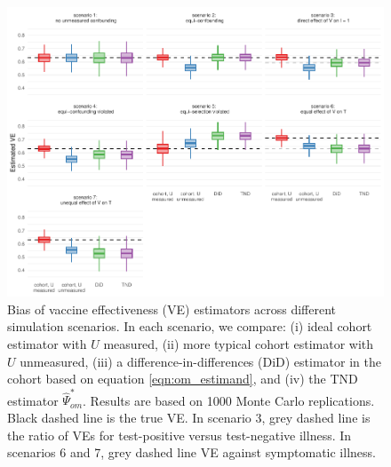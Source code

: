 \documentclass[11pt]{article}
\begin{document}
\begin{figure}
    \centering
    \includegraphics{../results/sims1.pdf}
    \caption{
        Bias of vaccine effectiveness (VE) estimators across different simulation scenarios. In each scenario, we compare: (i) ideal cohort estimator with $U$ measured, (ii) more typical cohort estimator with $U$ unmeasured, (iii) a difference-in-differences (DiD) estimator in the cohort based on equation \ref{eqn:om_estimand}, and (iv) the TND estimator $\widehat{\Psi}_{om}^*$. Results are based on 1000 Monte Carlo replications. Black dashed line is the true VE. In scenario 3, grey dashed line is the ratio of VEs for test-positive versus test-negative illness. In scenarios 6 and 7, grey dashed line VE against symptomatic illness.}
    \label{fig:sims1}
\end{figure}
\end{document}
